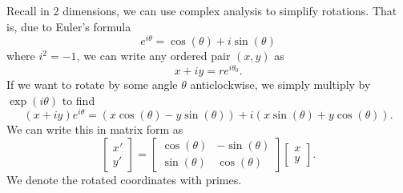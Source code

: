 
Recall in 2 dimensions, we can use complex analysis to simplify
rotations. That is, due to Euler's formula
\begin{equation}
e^{i\theta}=\cos(\theta)+i\sin(\theta)
\end{equation}
where $i^2=-1$, we can write any ordered pair $(x,y)$ as
\begin{equation}
x+iy=re^{i\theta_0}.
\end{equation}
If we want to rotate by some angle $\theta$ anticlockwise, we
simply multiply by $\exp(i\theta)$ to find
\begin{equation}
(x+iy)e^{i\theta} = (x\cos(\theta)-y\sin(\theta))+i(x\sin(\theta)+y\cos(\theta)).
\end{equation}
We can write this in matrix form as
\begin{equation}
\begin{bmatrix}
x'\\y'
\end{bmatrix}
=\begin{bmatrix} \cos(\theta) & -\sin(\theta)\\
\sin(\theta) & \cos(\theta)\end{bmatrix}\begin{bmatrix}x\\y\end{bmatrix}.
\end{equation}
We denote the rotated coordinates with primes.


